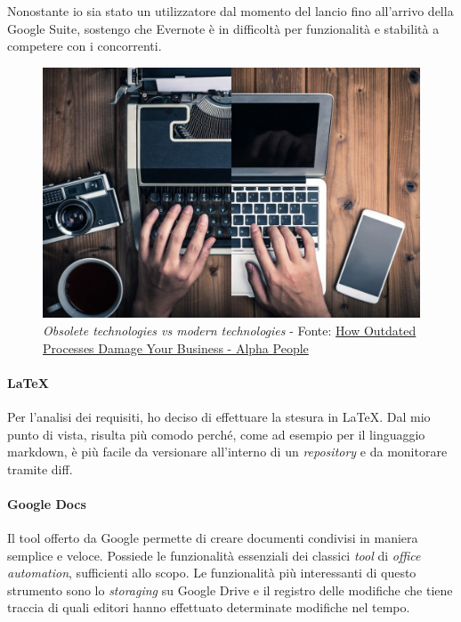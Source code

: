 Nonostante io sia stato un utilizzatore dal momento del lancio fino all'arrivo della Google Suite, sostengo che Evernote è in difficoltà per funzionalità e stabilità a competere con i concorrenti.
\vspace{20pt}
\begin{figure}[H]
    \centering
    \includegraphics[width=0.75\columnwidth]{immagini/outdated.jpeg}
    \caption{\textit{Obsolete technologies vs modern technologies} - Fonte: \href{https://alfapeople.com/outdated-processes-damage-business-part-1-obsolete-technologies/}{How Outdated Processes Damage Your Business - Alpha People}}
    \label{fig:oldTech}
\end{figure}

\paragraph{\LaTeX}
Per l'analisi dei requisiti, ho deciso di effettuare la stesura in \LaTeX.
Dal mio punto di vista, risulta più comodo perché, come ad esempio per il linguaggio \gls{markdown}\glsfirstoccur, è più facile da versionare all'interno di un \textit{repository} e da monitorare tramite \gls{diff}\glsfirstoccur.
\newpage
\paragraph{Google Docs}
Il tool offerto da Google permette di creare documenti condivisi in maniera semplice e veloce. Possiede le funzionalità essenziali dei classici \textit{tool} di \textit{office automation}, sufficienti allo scopo. Le funzionalità più interessanti di questo strumento sono lo \textit{storaging} su Google Drive e il registro delle modifiche che tiene traccia di quali editori hanno effettuato determinate modifiche nel tempo.
